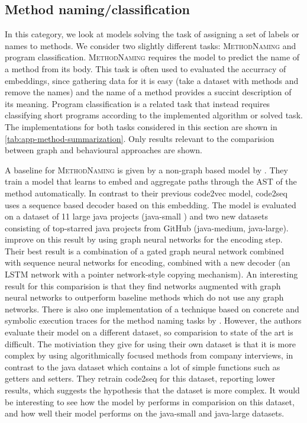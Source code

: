 \documentclass[sigconf,authordraft=true,nonacm=true]{acmart}
\begin{document}
\subsection{Method naming/classification}
In this category, we look at models solving the task of assigning a set of labels or names to methods.
We consider two slightly different tasks: \textsc{MethodNaming} and program classification.
\textsc{MethodNaming} requires the model to predict the name of a method from its body.
This task is often used to evaluated the accurracy of embeddings, since gathering data for it is easy (take a dataset with methods and remove the names) and the name of a method provides a succint description of its meaning.
Program classification is a related task that instead requires classifying short programs according to the implemented algorithm or solved task.
The implementations for both tasks considered in this section are shown in \cref{tab:app-method-summarization}.
Only results relevant to the comparision between graph and behavioural approaches are shown.

A baseline for \textsc{MethodNaming} is given by a non-graph based model by \citet{alon_code2seq_2019}.
They train a model that learns to embed and aggregate paths through the AST of the method automatically.
In contrast to their previous code2vec \cite{code2vec} model, code2seq uses a sequence based decoder based on this embedding.
The model is evaluated on a dataset of 11 large java projects (java-small \cite{allamanis_convolutional_2016}) and two new datasets consisting of top-starred java projects from GitHub (java-medium, java-large).
\citet{fernandes_structured_2020} improve on this result by using graph neural networks for the encoding step.
Their best result is a combination of a gated graph neural network combined with sequence neural networks for encoding, combined with a new decoder (an LSTM network with a pointer network-style copying mechanism).
An interesting result for this comparision is that they find networks augmented with graph neural networks to outperform baseline methods which do not use any graph networks.
There is also one implementation of a technique based on concrete and symbolic execution traces for the method naming tasks by \citet{wang_learning_2019-1}.
However, the authors evaluate their model on a different dataset, so comparision to state of the art is difficult.
The motiviation they give for using their own dataset is that it is more complex by using algorithmically focused methods from company interviews, in contrast to the java dataset which contains a lot of simple functions such as getters and setters.
They retrain code2seq for this dataset, reporting lower results, which suggests the hypothesis that the dataset is more complex.
It would be interesting to see how the model by \citet{fernandes_structured_2020} performs in comparision on this dataset, and how well their model performs on the java-small and java-large datasets.
\end{document}
